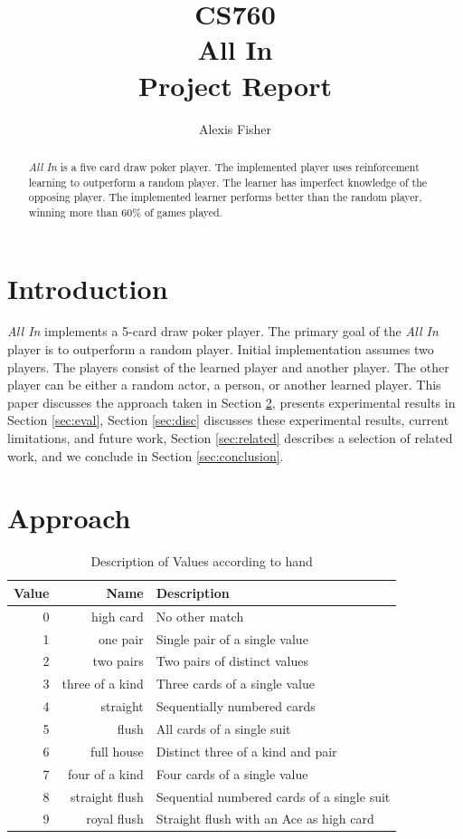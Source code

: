 \documentclass[12pt,pdftex]{article}
\title{CS760 \\ All In \\ Project Report }
\author{  Alexis Fisher }
\begin{document}
\ifpdf
{}
\else
{}
\fi
\maketitle
\begin{abstract}
\emph{All In} is a five card draw poker player.  
The implemented player uses reinforcement learning to outperform a random player. 
The learner has imperfect knowledge of the opposing player.
The implemented learner performs better than the random player, winning more than 60\% of games played.

\end{abstract}
\section{Introduction}
\emph{All In} implements a 5-card draw poker player. 
The primary goal of the \emph{All In} player is to outperform a random player. 
Initial implementation assumes two players. 
The players consist of the learned player and another player. 
The other player can be either a random actor, a person, or another learned player. 
This paper discusses the approach taken in Section \ref{sec:approach}, presents experimental results in Section \ref{sec:eval}, Section \ref{sec:disc} discusses these experimental results, current limitations, and future work, Section \ref{sec:related} describes a selection of related work, and we conclude in Section \ref{sec:conclusion}.

\section{Approach} \label{sec:approach}
\begin{table}[ht]
\centering
	\begin{tabular}{| r | r | l |}
\hline
\textbf{Value} & \textbf{Name} & \textbf{Description} \\
\hline
0 & high card & No other match \\
1 & one pair & Single pair of a single value\\
2 & two pairs & Two pairs of distinct values\\
3 & three of a kind & Three cards of a single value\\
4 & straight & Sequentially numbered cards\\
5 & flush & All cards of a single suit\\
6 & full house & Distinct three of a kind and pair\\
7 & four of a kind & Four cards of a single value\\
8 & straight flush & Sequential numbered cards of a single suit\\
9 & royal flush & Straight flush with an Ace as high card\\
\hline
\end{tabular}
\caption{Description of Values according to hand}
\label{tab:cardvalues}
\end{table}
\end{document}
